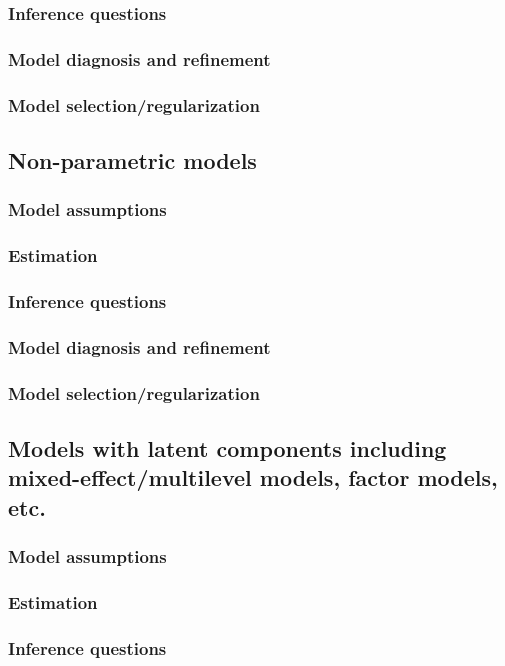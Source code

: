 \documentclass{article}
\begin{document}
\subsubsection{Inference questions}
\subsubsection{Model diagnosis and refinement}
\subsubsection{Model selection/regularization}

\subsection{Non-parametric models}
\subsubsection{Model assumptions}
\subsubsection{Estimation}
\subsubsection{Inference questions}
\subsubsection{Model diagnosis and refinement}
\subsubsection{Model selection/regularization}

\subsection{Models with latent components including mixed-effect/multilevel models, factor models, etc.}
\subsubsection{Model assumptions}
\subsubsection{Estimation}
\subsubsection{Inference questions}
\end{document}
